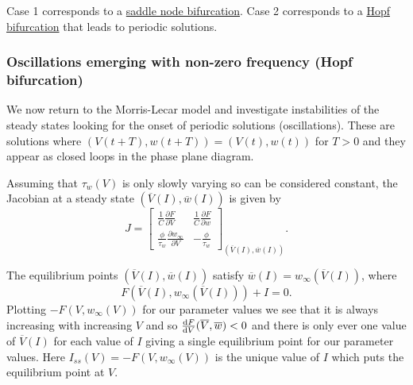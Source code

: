 \documentclass[11pt]{article}
\begin{document}
Case 1 corresponds to a
\href{https://www.scholarpedia.org/article/Saddle-node_bifurcation}{saddle
node bifurcation}. Case 2 corresponds to a
\href{http://www.scholarpedia.org/article/Hopf_bifurcation}{Hopf
bifurcation} that leads to periodic solutions.

    \hypertarget{oscillations-emerging-with-non-zero-frequency-hopf-bifurcation}{%
\subsubsection{Oscillations emerging with non-zero frequency (Hopf
bifurcation)}\label{oscillations-emerging-with-non-zero-frequency-hopf-bifurcation}}

We now return to the Morris-Lecar model and investigate instabilities of
the steady states looking for the onset of periodic solutions
(oscillations). These are solutions where
\((V(t+T), w(t+T))= (V(t), w(t))\) for \(T>0\) and they appear as closed
loops in the phase plane diagram.

Assuming that \(\tau_w(V)\) is only slowly varying so can be considered
constant, the Jacobian at a steady state
\((\overline{V}(I), \overline{w}(I))\) is given by
\[ J = \begin{bmatrix}\frac{1}{C} \frac{\partial F}{\partial V}  & \frac{1}{C} \frac{\partial F}{\partial w}\\ \frac{\phi}{\tau_w} \frac{\partial w_\infty}{\partial V} &  -\frac{\phi}{\tau_w} \end{bmatrix}_{(\overline{V}(I), \overline{w}(I))}.\]

The equilibrium points \((\overline{V}(I), \overline{w}(I))\) satisfy
\(\overline{w}(I)= w_\infty(\overline{V}(I))\), where
\[F(\overline{V}(I), w_\infty(\overline{V}(I)))+I=0.\] Plotting
\(-F(V, w_\infty(V))\) for our parameter values we see that it is always
increasing with increasing \(V\) and so
\(\frac{{\rm d}F}{{\rm d}{V}}(\overline{V}, \overline{w})<0\) and there
is only ever one value of \(\overline{V}(I)\) for each value of \(I\)
giving a single equilibrium point for our parameter values. Here
\(I_{ss}(V) = -F(V, w_\infty(V))\) is the unique value of \(I\) which
puts the equilibrium point at \(V\).
\end{document}
